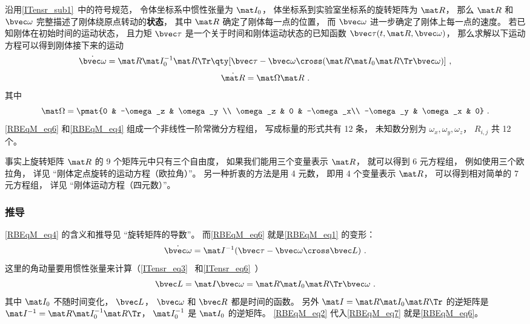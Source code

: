 沿用\autoref{ITensr_sub1}~中的符号规范， 令体坐标系中惯性张量为 $\mat I_0$， 体坐标系到实验室坐标系的旋转矩阵为 $\mat R$， 那么 $\mat R$ 和 $\bvec \omega$ 完整描述了刚体绕原点转动的\textbf{状态}， 其中 $\mat R$ 确定了刚体每一点的位置， 而 $\bvec \omega$ 进一步确定了刚体上每一点的速度。 若已知刚体在初始时间的运动状态， 且力矩 $\bvec \tau$ 是一个关于时间和刚体运动状态的已知函数 $\bvec \tau(t, \mat R, \bvec\omega)$， 那么求解以下运动方程可以得到刚体接下来的运动
\begin{equation}\label{RBEqM_eq6}
\dot{\bvec \omega} = \mat R \mat I_0^{-1} \mat R\Tr \qty[\bvec \tau  - \bvec\omega\cross(\mat R \mat I_0 \mat R\Tr \bvec\omega)]~,
\end{equation}
\begin{equation}\label{RBEqM_eq4}
\dot{\mat R} = \mat\Omega \mat R~.
\end{equation}
其中
\begin{equation}\label{RBEqM_eq5}
\mat\Omega = \pmat{0 & -\omega_z & \omega_y \\ \omega_z & 0 & -\omega_x\\ -\omega_y & \omega_x & 0}~.
\end{equation}
\autoref{RBEqM_eq6} 和\autoref{RBEqM_eq4} 组成一个非线性一阶常微分方程组， 写成标量的形式共有 12 条， 未知数分别为 $\omega_x, \omega_y, \omega_z$， $R_{i,j}$ 共 12 个。

事实上旋转矩阵 $\mat R$ 的 9 个矩阵元中只有三个自由度， 如果我们能用三个变量表示 $\mat R$， 就可以得到 6 元方程组， 例如使用三个欧拉角， 详见 “刚体定点旋转的运动方程（欧拉角）”。 另一种折衷的方法是用 4 元数， 即用 4 个变量表示 $\mat R$， 可以得到相对简单的 7 元方程组， 详见 “刚体运动方程（四元数）”。

\subsubsection{推导}

\autoref{RBEqM_eq4} 的含义和推导见 “旋转矩阵的导数”。 而\autoref{RBEqM_eq6} 就是\autoref{RBEqM_eq1} 的变形：
\begin{equation}\label{RBEqM_eq7}
\dot{\bvec \omega} = \mat I^{-1} (\bvec\tau - \bvec\omega\cross\bvec L)~.
\end{equation}
这里的角动量要用惯性张量来计算（\autoref{ITensr_eq3}~ 和\autoref{ITensr_eq6}~）
\begin{equation}\label{RBEqM_eq2}
\bvec L = \mat I \bvec \omega = \mat R \mat I_0 \mat R\Tr \bvec \omega~.
\end{equation}
其中 $\mat I_0$ 不随时间变化， $\bvec L$， $\bvec \omega$ 和 $\bvec R$ 都是时间的函数。 另外 $\mat I = \mat R \mat I_0 \mat R\Tr$ 的逆矩阵是 $\mat I^{-1} = \mat R \mat I_0^{-1} \mat R\Tr$， $\mat I_0^{-1}$ 是 $\mat I_0$ 的逆矩阵。 \autoref{RBEqM_eq2} 代入\autoref{RBEqM_eq7} 就是\autoref{RBEqM_eq6}。

